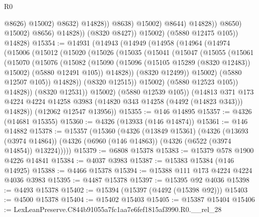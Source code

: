 \begin{lexlean}{R0}
\begin{coremodule}
                                          @8626)
                                        @15002)
                                      @8632)
                                    @14828))
                                @8638)
                              @15002)
                            @8644)
                          @14828))
                      @8650)
                    @15002)
                  @8656)
                @14828))
            (@8320 @8427))
          @15002)
        (@5880 @12475 @105))
      @14828)
@15354 := @14931
    (@14943
      (@14949
        (@14958
          (@14964
            (@14974
              (@15006
                (@15012
                  (@15020
                    (@15026
                      (@15035
                        (@15041
                          (@15047
                            (@15055
                              (@15061
                                (@15070
                                  (@15076
                                    (@15082
                                      (@15090
                                        (@15096 (@15105 @15289 (@8320 @12483)) @15002)
                                        (@5880 @12491 @105))
                                      @14828))
                                  (@8320 @12499))
                                @15002)
                              (@5880 @12507 @105))
                            @14828))
                        (@8320 @12515))
                      @15002)
                    (@5880 @12523 @105))
                  @14828))
              (@8320 @12531))
            @15002)
          (@5880 @12539 @105))
        (@14813
          @371
          @173
          @4224
          @4224
          @14258
          @3983
          (@14820 @343 @14258 (@4492 (@14823 @343)))
          @14828))
      (@12062 @12547 @13956))
@15355 := @146 @14895
@15357 := @4326 (@14681 @15355)
@15360 := @4326 (@13933 (@146 @14874))
@15361 := @146 @14882
@15378 := @15357
    (@15360
      (@4326
        (@13849 @15361)
        (@4326
          (@13693 (@3974 @14864))
          (@4326 (@6960 (@146 @14863)) (@4326 (@6522 (@3974 @14854)) @13224)))))
@15379 := @6808 @15378
@15383 := @15379 @578 @1900 @4226 @14841
@15384 := @4037 @3983
@15387 := @15383 @15384 (@146 @14925)
@15388 := @4466 @15378
@15394 := @15388 @111 @173 @4224 @4224 @4036 @3983
@15395 := @4487 @15378
@15397 := @15395 @92 @4036
@15398 := @4493 @15378
@15402 := @15394 (@15397 (@4492 (@15398 @92)))
@15403 := @4500 @15378
@15404 := @15402 @15403
@15405 := @15387 @15404
@15406 := LexLeanPreserve.C844b91055a7fc1aa7e6fef1815af3990.R0.__rel_28

\end{coremodule}
\end{lexlean}
